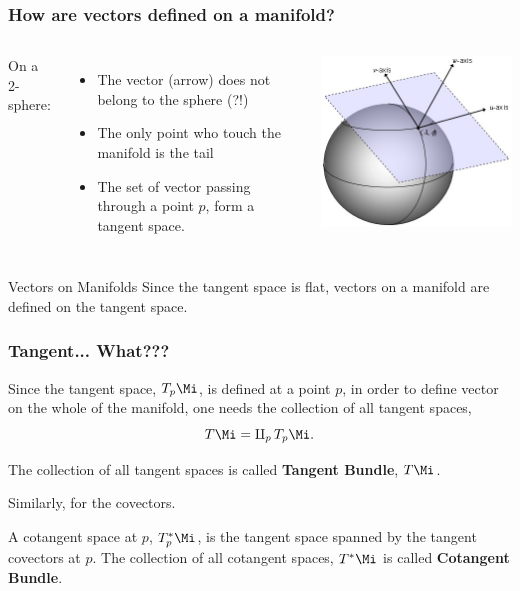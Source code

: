 \begin{frame}
  \frametitle{How are vectors defined on a manifold?}
  \begin{columns}
    On a 2-sphere:
    \begin{itemize}
    \item The vector (arrow) does not belong to the sphere (?!)
    \item The only point who touch the manifold is the tail
    \item The set of vector passing through a point $p$, form a tangent space.
    \end{itemize}
    \begin{center}
      \includegraphics[scale=.4]{Pictures/TanSphere.jpg}
    \end{center}
  \end{columns}

  \begin{alertblock}{Vectors on Manifolds}
    Since the tangent space is flat, vectors on a manifold are defined on the tangent space.
  \end{alertblock}
\end{frame}


\begin{frame}
  \frametitle{Tangent... What???}
  Since the tangent space, $T_p\Mi$, is defined at a point $p$, in order to define vector on the whole of the manifold, one needs the collection of all tangent spaces, $$T\Mi = \amalg_p\, T_p\Mi.$$
  \begin{definition}
    The collection of all tangent spaces is called \alert{\bf Tangent Bundle}, $T\Mi$.
  \end{definition}

  Similarly, for the covectors.
  \begin{definition}
    A cotangent space at $p$, $T^*_p\Mi$, is the tangent space spanned by the tangent covectors at $p$. The collection of all cotangent spaces, $T^*\Mi$ is called \alert{\bf Cotangent Bundle}.
  \end{definition}
\end{frame}

